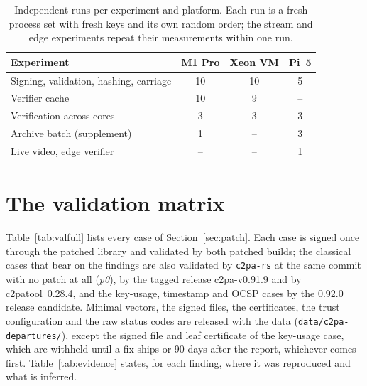\documentclass[acmsmall,screen,nonacm]{acmart}
\begin{document}
\begin{table}[h]
\caption{Independent runs per experiment and platform. Each run is a fresh
process set with fresh keys and its own random order; the stream and edge
experiments repeat their measurements within one run.}
\label{tab:runs}
\small
\begin{tabular}{lccc}
\toprule
Experiment & M1 Pro & Xeon VM & Pi~5\\
\midrule
Signing, validation, hashing, carriage & 10 & 10 & 5\\
Verifier cache & 10 & 9 & --\\
Verification across cores & 3 & 3 & 3\\
Archive batch (supplement) & 1 & -- & 3\\
Live video, edge verifier & -- & -- & 1\\
\bottomrule
\end{tabular}
\end{table}















\clearpage
\section{The validation matrix}
\label{sec:supp-val}

Table~\ref{tab:valfull} lists every case of Section~\ref{sec:patch}. Each case
is signed once through the patched library and validated by both patched
builds; the classical cases that bear on the findings are also validated by
\texttt{c2pa-rs} at the same commit with no patch at all (\emph{p0}), by the
tagged release c2pa-v0.91.9 and by c2patool~0.28.4, and the key-usage, timestamp
and OCSP cases by the 0.92.0 release candidate. Minimal vectors, the signed
files, the certificates, the trust configuration and the raw status codes are
released with the data (\texttt{data/c2pa-departures/}), except the signed file
and leaf certificate of the key-usage case, which are withheld until a fix
ships or 90 days after the report, whichever comes first.
Table~\ref{tab:evidence} states, for each finding, where it was reproduced and
what is inferred.
\end{document}
